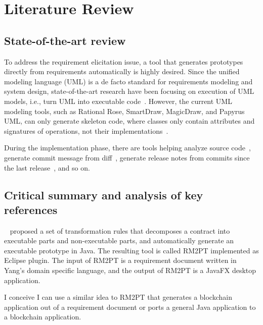 \chapter{Literature Review}



\section{State-of-the-art review}

To address the requirement elicitation issue, a tool that generates prototypes directly from requirements automatically is highly desired.
Since the unified modeling language (UML) is a de facto standard for requirements modeling and system design,
state-of-the-art research have been focusing on execution of UML models, i.e., turn UML into executable code~\cite{ciccozzi2019execution}.
However, the current UML modeling tools, such as Rational Rose, SmartDraw, MagicDraw, and Papyrus UML, can only generate skeleton code, where classes only contain attributes and signatures of operations, not their implementations~\cite{regep2000using}.

During the implementation phase, there are tools helping analyze source code~\cite{morgachev2019detection,huo2016learning,gu2016deep},
generate commit message from diff~\cite{linares2015changescribe,buse2010automatically,huang2020learning},
generate release notes from commits since the last release~\cite{moreno2016arena}, and so on.


\section{Critical summary and analysis of key references}

~\cite{yang2019automated} proposed a set of transformation rules that decomposes a contract into executable parts and non-executable parts, and automatically generate an executable prototype in Java.
The resulting tool is called RM2PT implemented as Eclipse plugin. The input of RM2PT is a requirement document written in Yang's domain specific language, and the output of RM2PT is a JavaFX desktop application.

I conceive I can use a similar idea to RM2PT that generates a blockchain application out of a requirement document or ports a general Java application to a blockchain application.


